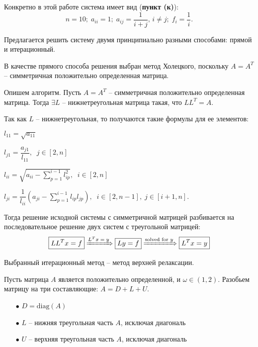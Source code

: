 		Конкретно в этой работе система имеет вид (\textbf{пункт (к)}):
		\begin{equation*}
			n = 10; \; a_{ii} = 1; \; a_{ij} = \frac{1}{i + j}, \, i \neq j; \; f_i = \frac{1}{i}.
		\end{equation*}
		
		Предлагается решить систему двумя принципиально разными способами: прямой и итерационный.
		
		
		В качестве прямого способа решения выбран метод Холецкого, поскольку $A = A^T$ -- симметричная положительно определенная матрица.
		
		Опишем алгоритм. Пусть $A = A^T$ -- симметричная положительно определенная матрица. Тогда $\exists L$ -- нижнетреугольная матрица такая, что $LL^T = A$.
		
		Так как $L$ -- нижнетреугольная, то получаются такие формулы для ее элементов:
		
		$l_{11} = \sqrt{a_{11}}$
		\vspace{2mm}
		
		$l_{j1} = \dfrac{a_{j1}}{l_{11}}, \;\; j \in \left[2, n\right]$
		\vspace{2mm}
		
		$l_{ii} = \sqrt{a_{ii} - \displaystyle\sum\limits_{p = 1}^{i-1} l_{ip}^2}, \;\; i \in \left[2, n\right]$
		\vspace{2mm}
		
		$l_{ji} = \dfrac{1}{l_{ii}}\left(a_{ji} - \displaystyle\sum\limits_{p=1}^{i-1} l_{ip} l_{jp} \right), \;\; i \in \left[2, n-1\right], \; j \in \left[i+1, n\right].$
		\vspace{2mm}
		
		Тогда решение исходной системы с симметричной матрицей разбивается на последовательное решение двух систем с треугольной матрицей:
		\begin{equation*}
			\boxed{LL^Tx = f} \xRightarrow[]{L^Tx\; =\; y} \boxed{Ly = f} \xRightarrow[]{\text{solved for }y} \boxed{L^Tx = y}
		\end{equation*}

		
	
		\newpage
		Выбранный итерационный метод -- метод верхней релаксации.
		
		Пусть матрица $A$ является положительно определенной, и $\omega \in (1, 2)$. Разобьем матрицу на три составляющие: $A = D + L + U$.
		\begin{itemize}
			\item[$\bullet$] $D = \text{diag}(A)$
			
			\item[$\bullet$] $L$ -- нижняя треугольная часть $A$, исключая диагональ
			
			\item[$\bullet$] $U$ -- верхняя треугольная часть $A$, исключая диагональ 
		\end{itemize}
		
